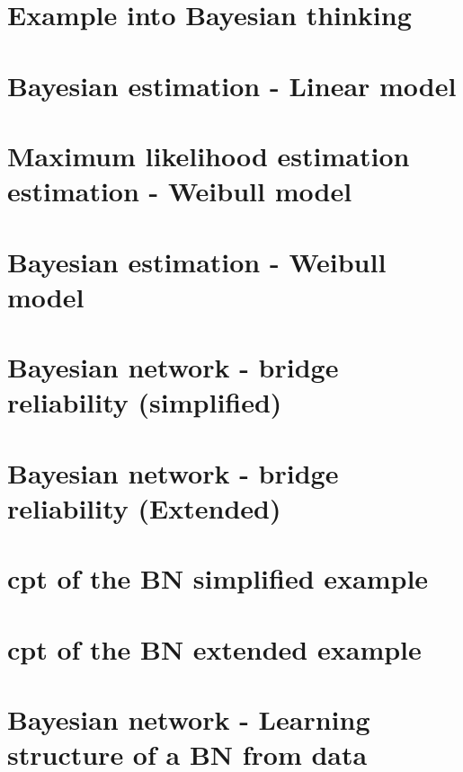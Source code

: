 


\pagebreak

\begin{subappendices}
\section{Example into Bayesian thinking}\label{bayesian1}

 \pagebreak
\section{Bayesian estimation - Linear model}\label{bayesian2}

  \pagebreak
  \section{Maximum likelihood estimation estimation - Weibull model}\label{bayesian4}
  
 \pagebreak
\section{Bayesian estimation - Weibull model}\label{bayesian3}

\pagebreak
\section{Bayesian network - bridge reliability (simplified)}\label{bayesian5}

\pagebreak
\section{Bayesian network - bridge reliability (Extended)}\label{bayesian6}

\pagebreak
\section{cpt of the BN simplified example}\label{Bndata1}

\pagebreak
\section{cpt of the BN extended example}\label{Bndata2}

\pagebreak
\section{Bayesian network - Learning structure of a BN from data}\label{bayesian7}

\end{subappendices}
% 
% 
% 
% 

